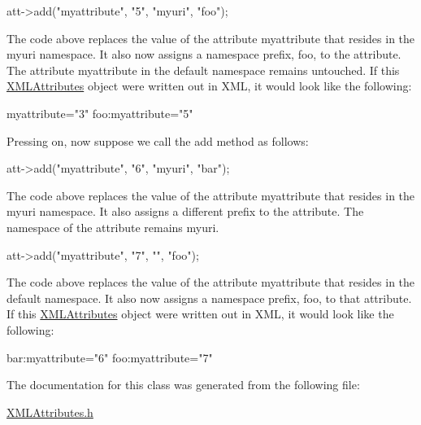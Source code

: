 \begin{DoxyCode}
att->add(\textcolor{stringliteral}{"myattribute"}, \textcolor{stringliteral}{"5"}, \textcolor{stringliteral}{"myuri"}, \textcolor{stringliteral}{"foo"});
\end{DoxyCode}
 The code above replaces the value of the attribute {\ttfamily myattribute} that resides in the {\ttfamily myuri} namespace. It also now assigns a namespace prefix, {\ttfamily foo}, to the attribute. The attribute {\ttfamily myattribute} in the default namespace remains untouched. If this \hyperlink{class_x_m_l_attributes}{X\+M\+L\+Attributes} object were written out in X\+ML, it would look like the following\+: \begin{center}
\begin{DoxyPre}
myattribute="3"
foo:myattribute="5"
   \end{DoxyPre}
\end{center}  Pressing on, now suppose we call the {\ttfamily add} method as follows\+:


\begin{DoxyCode}
att->add(\textcolor{stringliteral}{"myattribute"}, \textcolor{stringliteral}{"6"}, \textcolor{stringliteral}{"myuri"}, \textcolor{stringliteral}{"bar"});
\end{DoxyCode}
 The code above replaces the value of the attribute {\ttfamily myattribute} that resides in the {\ttfamily myuri} namespace. It also assigns a different prefix to the attribute. The namespace of the attribute remains {\ttfamily myuri}.


\begin{DoxyCode}
att->add(\textcolor{stringliteral}{"myattribute"}, \textcolor{stringliteral}{"7"}, \textcolor{stringliteral}{""}, \textcolor{stringliteral}{"foo"});
\end{DoxyCode}


The code above replaces the value of the attribute {\ttfamily myattribute} that resides in the default namespace. It also now assigns a namespace prefix, {\ttfamily foo}, to that attribute. If this \hyperlink{class_x_m_l_attributes}{X\+M\+L\+Attributes} object were written out in X\+ML, it would look like the following\+: \begin{center}
\begin{DoxyPre}
bar:myattribute="6"
foo:myattribute="7"
   \end{DoxyPre}
\end{center}  

The documentation for this class was generated from the following file\+:\begin{DoxyCompactItemize}
\item 
\hyperlink{_x_m_l_attributes_8h}{X\+M\+L\+Attributes.\+h}\end{DoxyCompactItemize}
